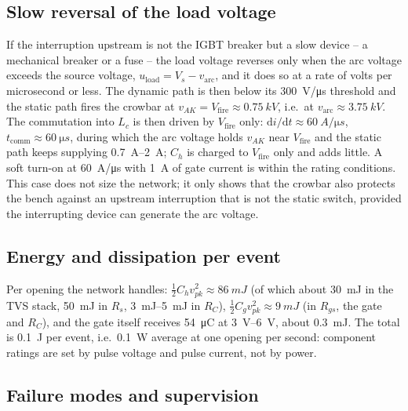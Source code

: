 \documentclass[11pt,a4paper]{article}
\begin{document}
\subsection{Slow reversal of the load voltage}
\label{sec:slow}

If the interruption upstream is not the IGBT breaker but a slow device -- a mechanical breaker
or a fuse -- the load voltage reverses only when the arc voltage exceeds the source voltage,
$u_{\mathrm{load}} = V_s - v_{\mathrm{arc}}$, and it does so at a rate of volts per microsecond or
less. The dynamic path is then below its \SI{300}{V/\micro s} threshold and the static path
fires the crowbar at $v_{AK} = V_{\mathrm{fire}} \approx \SI{0.75}{kV}$, i.e.\ at
$v_{\mathrm{arc}} \approx \SI{3.75}{kV}$. The commutation into $L_c$ is then driven by
$V_{\mathrm{fire}}$ only: $\mathrm{d}i/\mathrm{d}t \approx \SI{60}{A/\micro s}$,
$t_{\mathrm{comm}} \approx \SI{60}{\micro s}$, during which the arc voltage holds $v_{AK}$ near
$V_{\mathrm{fire}}$ and the static path keeps supplying \SIrange{0.7}{2}{A}; $C_h$ is charged to
$V_{\mathrm{fire}}$ only and adds little. A soft turn-on at \SI{60}{A/\micro s} with
\SI{1}{A} of gate current is within the rating conditions. This case does not size the network;
it only shows that the crowbar also protects the bench against an upstream interruption that
is not the static switch, provided the interrupting device can generate the arc voltage.

\subsection{Energy and dissipation per event}

Per opening the network handles: $\tfrac12 C_h v_{pk}^2 \approx \SI{86}{mJ}$ (of which about
\SI{30}{mJ} in the TVS stack, \SI{50}{mJ} in $R_s$, \SIrange{3}{5}{mJ} in $R_C$),
$\tfrac12 C_g v_{pk}^2 \approx \SI{9}{mJ}$ (in $R_{gs}$, the gate and $R_C$), and the gate
itself receives \SI{54}{\micro C} at \SIrange{3}{6}{V}, about \SI{0.3}{mJ}. The total is
\SI{0.1}{J} per event, i.e.\ \SI{0.1}{W} average at one opening per second: component ratings
are set by pulse voltage and pulse current, not by power.

\subsection{Failure modes and supervision}
\label{sec:fmea}
\end{document}
